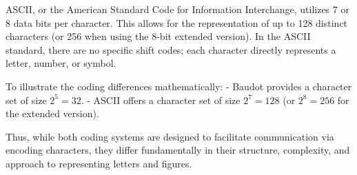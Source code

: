 ASCII, or the American Standard Code for Information Interchange, utilizes 7 or 8 data bits per character. This allows for the representation of up to 128 distinct characters (or 256 when using the 8-bit extended version). In the ASCII standard, there are no specific shift codes; each character directly represents a letter, number, or symbol. 

To illustrate the coding differences mathematically:
- Baudot provides a character set of size \( 2^5 = 32 \).
- ASCII offers a character set of size \( 2^7 = 128 \) (or \( 2^8 = 256 \) for the extended version).

Thus, while both coding systems are designed to facilitate communication via encoding characters, they differ fundamentally in their structure, complexity, and approach to representing letters and figures.

